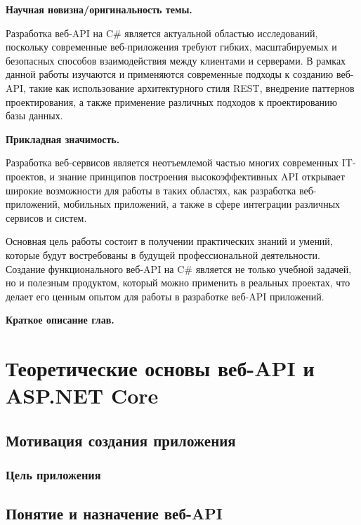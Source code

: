 \documentclass[a4paper,12pt]{report}
\begin{document}
\textbf{Научная новизна/оригинальность темы.}

Разработка веб-\acs{API} на C\# является актуальной областью исследований, поскольку современные веб-приложения требуют гибких, 
масштабируемых и безопасных способов взаимодействия между клиентами и серверами. В рамках данной работы изучаются
и применяются современные подходы к созданию веб-\acs{API}, такие как использование архитектурного стиля \acs{REST}, внедрение паттернов 
проектирования, а также применение различных подходов к проектированию базы данных.

\textbf{Прикладная значимость.}

Разработка веб-сервисов является неотъемлемой частью многих современных IT-проектов, и знание принципов построения высокоэффективных 
API открывает широкие возможности для работы в таких областях, как разработка веб-приложений, мобильных приложений, 
а также в сфере интеграции различных сервисов и систем.

Основная цель работы состоит в получении практических знаний и умений, которые будут востребованы в будущей профессиональной деятельности. 
Создание функционального веб-\acs{API} на C\# является не только учебной задачей, но и полезным продуктом, который можно применить в реальных проектах, 
что делает его ценным опытом для работы в разработке веб-\acs{API} приложений.

\textbf{Краткое описание глав.}


\chapter{Теоретические основы веб-\acs{API} и ASP.NET Core}\label{intro_chapter_title}

\section{Мотивация создания приложения}

\subsection{Цель приложения}

\subsection{}

\section{Понятие и назначение веб-\acs{API}}
\end{document}
